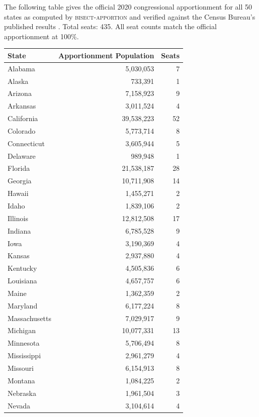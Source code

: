 The following table gives the official 2020 congressional apportionment
for all 50 states as computed by \textsc{bisect-apportion} and
verified against the Census Bureau's published results
\citep{census2020apportionment}.
Total seats: 435. All seat counts match the official apportionment
at 100\%.

\begin{longtable}{lrr}
\toprule
State & Apportionment Population & Seats \\
\midrule
\endhead
Alabama        & 5,030,053  & 7 \\
Alaska         & 733,391    & 1 \\
Arizona        & 7,158,923  & 9 \\
Arkansas       & 3,011,524  & 4 \\
California     & 39,538,223 & 52 \\
Colorado       & 5,773,714  & 8 \\
Connecticut    & 3,605,944  & 5 \\
Delaware       & 989,948    & 1 \\
Florida        & 21,538,187 & 28 \\
Georgia        & 10,711,908 & 14 \\
Hawaii         & 1,455,271  & 2 \\
Idaho          & 1,839,106  & 2 \\
Illinois       & 12,812,508 & 17 \\
Indiana        & 6,785,528  & 9 \\
Iowa           & 3,190,369  & 4 \\
Kansas         & 2,937,880  & 4 \\
Kentucky       & 4,505,836  & 6 \\
Louisiana      & 4,657,757  & 6 \\
Maine          & 1,362,359  & 2 \\
Maryland       & 6,177,224  & 8 \\
Massachusetts  & 7,029,917  & 9 \\
Michigan       & 10,077,331 & 13 \\
Minnesota      & 5,706,494  & 8 \\
Mississippi    & 2,961,279  & 4 \\
Missouri       & 6,154,913  & 8 \\
Montana        & 1,084,225  & 2 \\
Nebraska       & 1,961,504  & 3 \\
Nevada         & 3,104,614  & 4 \\

\end{longtable}

